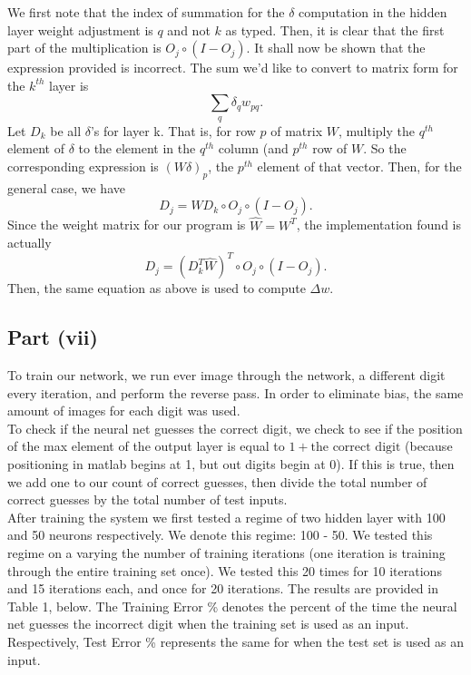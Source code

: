 \documentclass[12pt]{article}
\begin{document}
We first note that the index of summation for the $\delta$ computation in the hidden layer weight adjustment is $q$ and not $k$ as typed.
Then, it is clear that the first part of the multiplication is $O_j\circ (I-O_j)$.
It shall now be shown that the expression provided is incorrect.
The sum we'd like to convert to matrix form for the $k^{th}$ layer is 
\[\sum_{q}\delta_q w_{pq}.\]
Let $D_k$ be all $\delta$'s for layer k.
That is, for row $p$ of matrix $W$, multiply the $q^{th}$ element of $\delta$ to the element in the $q^{th}$ column (and $p^{th}$ row of $W$.
So the corresponding expression is $(W\delta)_p$, the $p^{th}$ element of that vector.
Then, for the general case, we have \[D_j = WD_k \circ O_j\circ (I-O_j).\]
Since the weight matrix for our program is $\hat W =W^T$, the implementation found is actually 
\[D_j = (D_k^T\hat W)^T\circ O_j\circ (I-O_j).\]
Then, the same equation as above is used to compute \(\Delta w\).

\subsection*{Part (vii)}
To train our network, we run ever image through the network, a different digit every iteration, and perform the reverse pass.
In order to eliminate bias, the same amount of images for each digit was used.\\
To check if the neural net guesses the correct digit, we check to see if the position of the max element of the output layer is equal to $1+\text{the correct digit}$ (because positioning in matlab begins at 1, but out digits begin at 0). If this is true, then we add one to our count of correct guesses, then divide the total number of correct guesses by the total number of test inputs.\\
After training the system we first tested a regime of two hidden layer with 100 and 50 neurons respectively. We denote this regime: 100 - 50. We tested this regime on a varying the number of training iterations (one iteration is training through the entire training set once). We tested this 20 times for 10 iterations and 15 iterations each, and once for 20 iterations. The results are provided in Table 1, below. The Training Error \% denotes the percent of the time the neural net guesses the incorrect digit when the training set is used as an input. Respectively, Test Error \% represents the same for when the test set is used as an input.
\end{document}
